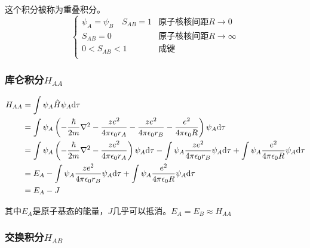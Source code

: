 这个积分被称为重叠积分。
\begin{equation*}
	\begin{cases}
		\psi_A = \psi_B \quad S_{AB} = 1 & \mbox{原子核核间距} R \to 0      \\
		S_{AB} = 0                       & \mbox{原子核核间距} R \to \infty \\
		0 < S_{AB} < 1                   & \mbox{成键}                      \\
	\end{cases}
\end{equation*}

\subsubsection{库仑积分$H_{AA}$}

\begin{align*}
	H_{AA} & = \int \psi_A \hat{H} \psi_A \mathrm{d} \tau                                                                                                                                                                                           \\
	       & = \int \psi_A \left( -\frac{\hbar}{2m} \nabla^2 - \frac{ze^2}{4\pi\epsilon_0r_A} - \frac{ze^2}{4\pi\epsilon_0r_B} -  \frac{e^2}{4\pi\epsilon_0R}  \right) \psi_A \mathrm{d} \tau                                                       \\
	       & = \int \psi_A \left( -\frac{\hbar}{2m} \nabla^2 - \frac{ze^2}{4\pi\epsilon_0r_A} \right) \psi_A \mathrm{d} \tau  - \int \psi_A \frac{ze^2}{4\pi\epsilon_0r_B} \psi_A \mathrm{d} \tau + \int \psi_A  \frac{e^2}{4\pi\epsilon_0R} \psi_A \mathrm{d} \tau \\
	       & = E_A - \int \psi_A \frac{ze^2}{4\pi\epsilon_0r_B} \psi_A \mathrm{d} \tau + \int \psi_A  \frac{e^2}{4\pi\epsilon_0R} \psi_A \mathrm{d} \tau                                                                                                    \\
	       & = E_A - J
\end{align*}

其中$E_A$是原子基态的能量，$J$几乎可以抵消。$E_A = E_B \approx H_{AA}$

\subsubsection{交换积分$H_{AB}$}

